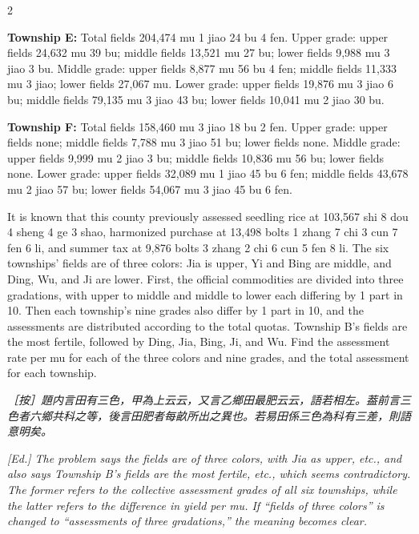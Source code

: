 \documentclass[11pt,a4paper]{article}
\newcommand{\EdNoteText}[1]{\par\noindent\textit{\color{ednotecolor}［按］#1}\par}
\newcommand{\EdNoteEn}[1]{\par\noindent\textit{\color{ednotecolor}[Ed.] #1}\par}
\begin{document}
\begin{paracol}{2}
{\textbf{Township E:} Total fields 204,474 mu 1 jiao 24 bu 4 fen. Upper grade: upper fields 24,632 mu 39 bu; middle fields 13,521 mu 27 bu; lower fields 9,988 mu 3 jiao 3 bu. Middle grade: upper fields 8,877 mu 56 bu 4 fen; middle fields 11,333 mu 3 jiao; lower fields 27,067 mu. Lower grade: upper fields 19,876 mu 3 jiao 6 bu; middle fields 79,135 mu 3 jiao 43 bu; lower fields 10,041 mu 2 jiao 30 bu.

\textbf{Township F:} Total fields 158,460 mu 3 jiao 18 bu 2 fen. Upper grade: upper fields none; middle fields 7,788 mu 3 jiao 51 bu; lower fields none. Middle grade: upper fields 9,999 mu 2 jiao 3 bu; middle fields 10,836 mu 56 bu; lower fields none. Lower grade: upper fields 32,089 mu 1 jiao 45 bu 6 fen; middle fields 43,678 mu 2 jiao 57 bu; lower fields 54,067 mu 3 jiao 45 bu 6 fen.

It is known that this county previously assessed seedling rice at 103,567 shi 8 dou 4 sheng 4 ge 3 shao, harmonized purchase at 13,498 bolts 1 zhang 7 chi 3 cun 7 fen 6 li, and summer tax at 9,876 bolts 3 zhang 2 chi 6 cun 5 fen 8 li. The six townships' fields are of three colors: Jia is upper, Yi and Bing are middle, and Ding, Wu, and Ji are lower. First, the official commodities are divided into three gradations, with upper to middle and middle to lower each differing by 1 part in 10. Then each township's nine grades also differ by 1 part in 10, and the assessments are distributed according to the total quotas. Township B's fields are the most fertile, followed by Ding, Jia, Bing, Ji, and Wu. Find the assessment rate per mu for each of the three colors and nine grades, and the total assessment for each township.}

\switchcolumn*

\EdNoteText{題内言田有三色，甲為上云云，又言乙鄉田最肥云云，語若相左。葢前言三色者六鄉共科之等，後言田肥者每畝所出之異也。若易田係三色為科有三差，則語意明矣。}

\switchcolumn

\EdNoteEn{The problem says the fields are of three colors, with Jia as upper, etc., and also says Township B's fields are the most fertile, etc., which seems contradictory. The former refers to the collective assessment grades of all six townships, while the latter refers to the difference in yield per mu. If ``fields of three colors'' is changed to ``assessments of three gradations,'' the meaning becomes clear.}

\end{paracol}
\end{document}
